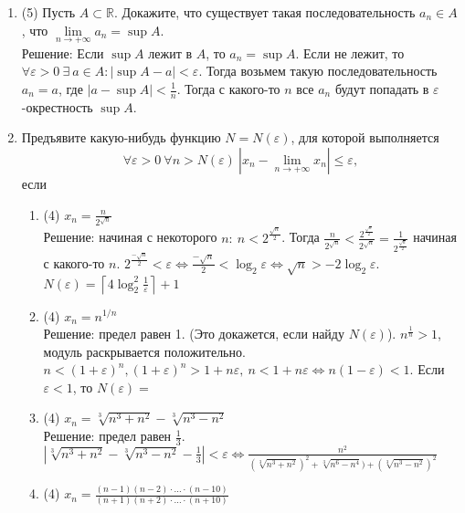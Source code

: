 \documentclass[a4paper]{article}
\def\eps{\varepsilon}
\begin{document}
\begin{enumerate}
	\item (5) Пусть $A\subset\mathbb R$. Докажите, что существует такая последовательность $a_n\in A$, что $\lim\limits_{n\to +\infty} a_n = \sup A$.\\
	Решение: Если $\sup A$ лежит в $A$, то $a_n = \sup A$. Если не лежит, то $\forall \eps > 0\ \exists\ a\in A:|\sup A - a| < \eps$. Тогда возьмем такую последовательность $a_n = a$, где $|a - \sup A| < \frac{1}{n}$. Тогда с какого-то $n$ все $a_n$ будут попадать в $\eps$-окрестность $\sup A$. 
    \item Предъявите какую-нибудь функцию $N = N(\eps)$, для которой выполняется
    \[
        \forall \eps>0\ \forall n> N(\eps)\ |x_n-\lim\limits_{n\to+\infty} x_n|\leq \eps,
    \]
    если
    \begin{enumerate}
        \item (4) $x_n = \frac{n}{2^{\sqrt{n}}}$\\
        Решение: начиная с некоторого $n:\ n < 2^{\frac{\sqrt{n}}{2}}$. Тогда $\frac{n}{2^{\sqrt{n}}} < \frac{2^{\frac{\sqrt{n}}{2}}}{2^{\sqrt{n}}} = \frac{1}{2^{\frac{\sqrt{n}}{2}}}$ начиная с какого-то $n$. $2^{\frac{-\sqrt{n}}{2}} < \eps \Leftrightarrow \frac{-\sqrt{n}}{2} < \log_2\eps \Leftrightarrow \sqrt{n} > -2\log_2\eps$. $N(\eps) = \left \lceil{4\log^2_2\frac{1}{\eps}}\right \rceil + 1$ 
        \item (4) $x_n = n^{1/n}$\\
        Решение: предел равен 1. (Это докажется, если найду $N(\eps)$). $n^{\frac{1}{n}} > 1$, модуль раскрывается положительно. $n < (1 + \eps)^n, (1 + \eps)^n > 1 + n\eps,\ n < 1 + n\eps \Leftrightarrow n(1-\eps) < 1$. Если $\eps < 1$, то $N(\eps) = $ 
        \item (4) $x_n = \sqrt[3]{n^3 + n^2} - \sqrt[3]{n^3 - n^2}$\\
        Решение: предел равен $\frac{1}{3}$. $|\sqrt[3]{n^3 + n^2} - \sqrt[3]{n^3 - n^2} - \frac{1}{3}| < \eps \Leftrightarrow \frac{n^2}{(\sqrt[3]{n^3 + n^2})^2 + \sqrt[3]{n^6 - n^4}) + (\sqrt[3]{n^3 - n^2})^2}$
        \item (4) $x_n = \frac{(n-1)(n-2)\cdot\dots\cdot (n-10)}{(n+1)(n+2)\cdot\dots\cdot(n+10)}$
    \end{enumerate}
    

\end{enumerate}
\end{document}
